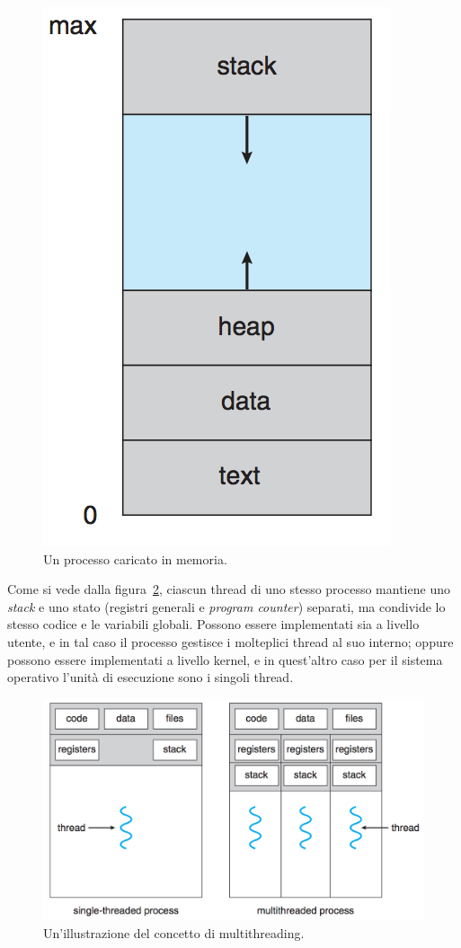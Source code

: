 \documentclass[12pt,a4paper]{report}
\begin{document}
			\begin{figure}[htbp]
			\centering
			\includegraphics[scale=0.7]{img/process.png}
			\caption{Un processo caricato in memoria. \cite{Silberschatz}\label{fig:process}}
			\end{figure}
			
			Come si vede dalla figura~\ref{fig:thread}, ciascun thread di uno stesso processo mantiene uno \emph{stack} e uno stato (registri generali e \emph{program counter})
			separati, ma condivide lo stesso codice e le variabili globali.
			Possono essere implementati sia a livello utente, e in tal caso il processo gestisce i molteplici thread al suo interno; oppure possono essere implementati
			a livello kernel, e in quest'altro caso per il sistema operativo l'unità di esecuzione sono i singoli thread.
						
			\begin{figure}[htbp]
			\centering
			\includegraphics[scale=0.7]{img/thread.png}
			\caption{Un'illustrazione del concetto di multithreading. \cite{Silberschatz}\label{fig:thread}}
			\end{figure}
\end{document}
